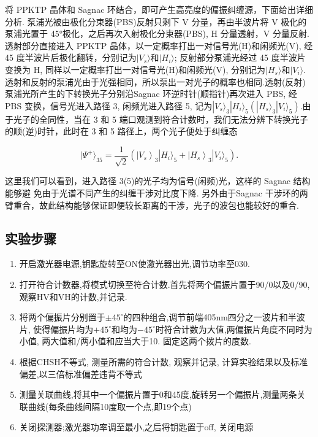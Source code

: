 \documentclass[a4paper,UTF8]{ctexart}
\begin{document}
 将 PPKTP 晶体和 Sagnac 环结合，即可产生高亮度的偏振纠缠源，下面给出详细分析. 泵浦光被由极化分束器(PBS)反射只剩下 V 分量，再由半波片将 V 极化的泵浦光置于 45°极化，之后再次入射极化分束器(PBS), H 分量透射，V 分量反射.透射部分直接进入 PPKTP 晶体，以一定概率打出一对信号光(H)和闲频光(V), 经 45 度半波片后极化翻转，分别记为$|V_s\rangle$和$|H_i\rangle$; 反射部分泵浦光经过 45 度半波片变换为 H, 同样以一定概率打出一对信号光(H)和闲频光(V), 分别记为$|H_s\rangle$和$|V_i\rangle$.透射和反射的泵浦光由于光强相同，所以泵出一对光子的概率也相同.透射(反射)泵浦光所产生的下转换光子分别沿Sagnac 环逆时针(顺指针)再次进入 PBS, 经 PBS 变换，信号光进入路径 3, 闲频光进入路径 5, 记为$|V_s\rangle_3|H_i\rangle_5(|H_s\rangle_3|V_i\rangle_5)$.由于光子的全同性，当在 3 和 5 端口观测到符合计数时，我们无法分辨下转换光子的顺(逆)时针，此时在 3 和 5 路径上，两个光子便处于纠缠态

$$
|\Psi^{+}\rangle_{35}=\frac{1}{\sqrt{2}}\left(\left|V_{s}\right\rangle_{3}|H_{i}\rangle_{5}+\left|H_{s}\right\rangle_{3}|V_{i}\rangle_{5}\right).
$$

这里我们可以看到，进入路径 3(5)的光子均为信号(闲频)光，这样的 Sagnac 结构能够避
免由于光谱不同产生的纠缠干涉对比度下降. 另外由于Sagnac 干涉环的两臂重合，故此结构能够保证即便较长距离的干涉，光子的波包也能较好的重合.

\subsection{实验步骤}

\begin{enumerate}
    \item 开启激光器电源,钥匙旋转至ON使激光器出光,调节功率至030.
    \item 打开符合计数器,将模式切换至符合计数.首先将两个偏振片置于90/0以及0/90,观察HV和VH的计数,并记录.
    \item 将两个偏振片分别置于$\pm 45^{\circ}$的四种组合,调节前端405nm四分之一波片和半波片,
    使得偏振片均为$+45^{\circ}$和均为$-45^{\circ}$时符合计数为大值,两偏振片角度不同时为小值,
     两大值和/两小值和应当大于10. 固定这两个拨片的度数.
    \item 根据CHSH不等式, 测量所需的符合计数, 观察并记录, 计算实验结果以及标准偏差,以三倍标准偏差违背不等式
    \item 测量关联曲线,将其中一个偏振片置于0和45度,旋转另一个偏振片,测量两条关联曲线(每条曲线间隔10度取一个点,即19个点)
    \item 关闭探测器;激光器功率调至最小,之后将钥匙置于off, 关闭电源
\end{enumerate}
\end{document}
